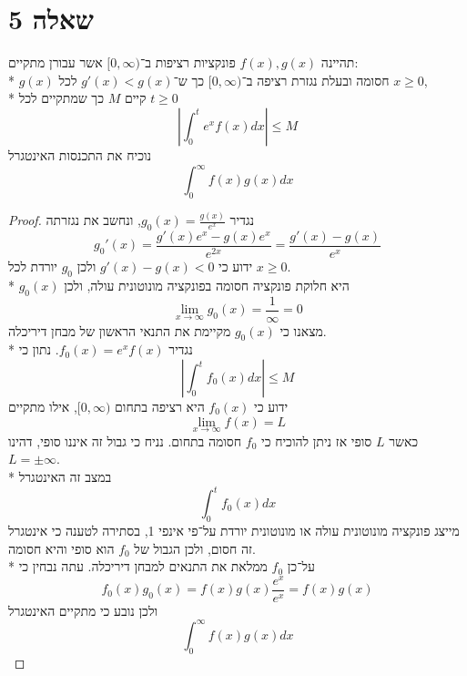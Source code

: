 \section{שאלה 5}
תהיינה $f(x), g(x)$ פונקציות רציפות ב־$[0, \infty)$ אשר עבורן מתקיים: \\* %
$g(x)$ חסומה ובעלת נגזרת רציפה ב־$[0, \infty)$ כך ש־$g'(x) < g(x)$ לכל $x \ge 0$, \\* %
קיים $M$ כך שמתקיים לכל $t \ge 0$
\[
	\left\lvert \int_0^t e^x f(x) dx \right\rvert \le M
\]
נוכיח את התכנסות האינטגרל
\[
	\int_0^\infty f(x) g(x) dx
\]
\begin{proof}
	נגדיר $g_0(x) = \frac{g(x)}{e^x}$, ונחשב את נגזרתה
	\[
		g_0'(x) = \frac{g'(x) e^x - g(x) e^x}{e^{2x}} = \frac{g'(x) - g(x)}{e^x}
	\]
	ידוע כי $g'(x) - g(x) < 0$ ולכן $g_0$ יורדת לכל $x \ge 0$. \\*
	$g_0(x)$ היא חלוקת פונקציה חסומה בפונקציה מונוטונית עולה, ולכן
	\[
		\lim_{x \to \infty} g_0(x) = \frac{1}{\infty} = 0
	\]
	מצאנו כי $g_0(x)$ מקיימת את התנאי הראשון של מבחן דיריכלה. \\*
	נגדיר $f_0(x) = e^x f(x)$. נתון כי
	\[
		\left\lvert \int_0^t f_0(x) dx \right\rvert \le M
	\]
	ידוע כי $f_0(x)$ היא רציפה בתחום $[0, \infty)$, אילו מתקיים %
	\[
		\lim_{x \to \infty} f(x) = L
	\]
	כאשר $L$ סופי אז ניתן להוכיח כי $f_0$ חסומה בתחום. נניח כי גבול זה איננו סופי, דהינו $L = \pm \infty$. \\*
	במצב זה האינטגרל
	\[
		\int_0^t f_0(x) dx
	\]
	מייצג פונקציה מונוטונית עולה או מונוטונית יורדת על־פי אינפי 1, בסתירה לטענה כי אינטגרל זה חסום, ולכן הגבול של $f_0$ הוא סופי והיא חסומה. \\*
	על־כן $f_0$ ממלאת את התנאים למבחן דיריכלה. עתה נבחין כי
	\[
		f_0(x) g_0(x) = f(x) g(x) \frac{e^x}{e^x} = f(x) g(x)
	\]
	ולכן נובע כי מתקיים האינטגרל
	\[
		\int_0^\infty f(x) g(x) dx
	\]

\end{proof}


